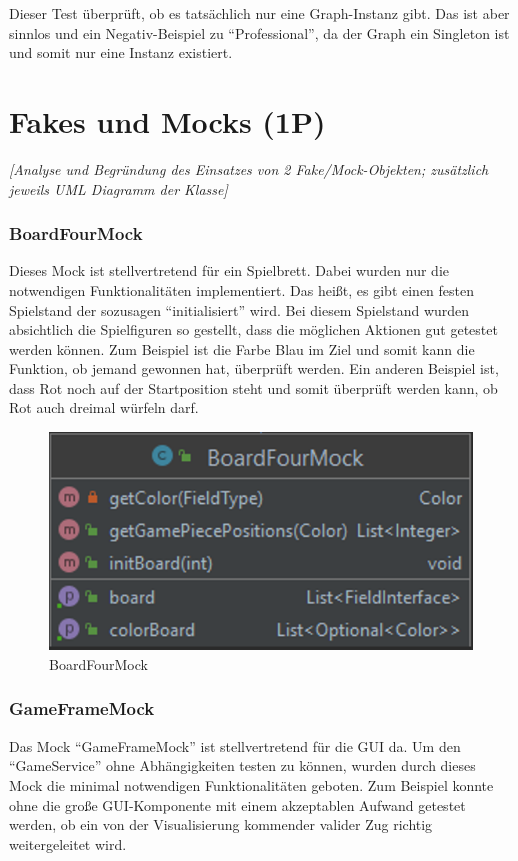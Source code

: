 \noindent Dieser Test überprüft, ob es tatsächlich nur eine Graph-Instanz gibt. Das ist aber sinnlos und ein Negativ-Beispiel zu \enquote{Professional}, da der Graph ein Singleton ist und somit nur eine Instanz existiert. 

\section{Fakes und Mocks (1P)}
\emph{[Analyse und Begründung des Einsatzes von 2 Fake/Mock-Objekten; zusätzlich jeweils UML
Diagramm der Klasse]}

\subsubsection{BoardFourMock}
\noindent Dieses Mock ist stellvertretend für ein Spielbrett. Dabei wurden nur die notwendigen Funktionalitäten implementiert. Das heißt, es gibt einen festen Spielstand der sozusagen \enquote{initialisiert} wird. Bei diesem Spielstand wurden absichtlich die Spielfiguren so gestellt, dass die möglichen Aktionen gut getestet werden können. Zum Beispiel ist die Farbe Blau im Ziel und somit kann die Funktion, ob jemand gewonnen hat, überprüft werden. Ein anderen Beispiel ist, dass Rot noch auf der Startposition steht und somit überprüft werden kann, ob Rot auch dreimal würfeln darf.

\begin{figure}[htbp]
\centering
\centerline{\includegraphics[scale=.5]{boardfourmock}}
\caption{BoardFourMock}
\label{fig:boardfourmock}
\end{figure}


\newpage
\subsubsection{GameFrameMock}
\noindent Das Mock \enquote{GameFrameMock} ist stellvertretend für die GUI da. Um den \enquote{GameService} ohne Abhängigkeiten testen zu können, wurden durch dieses Mock die minimal notwendigen Funktionalitäten geboten. Zum Beispiel konnte ohne die große GUI-Komponente mit einem akzeptablen Aufwand getestet werden, ob ein von der Visualisierung kommender valider Zug richtig weitergeleitet wird.

